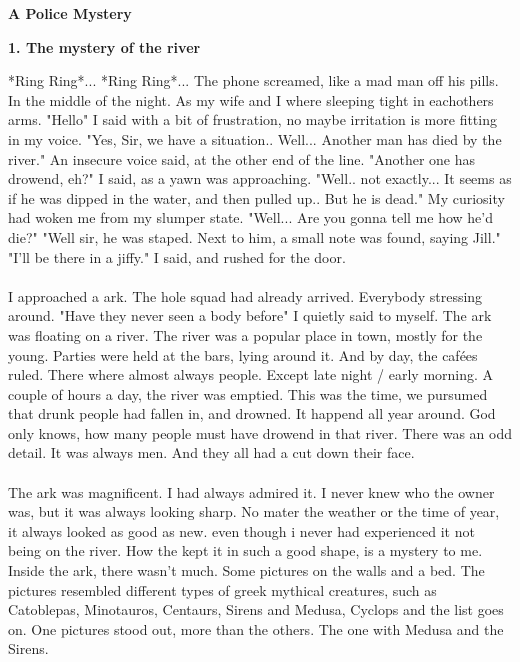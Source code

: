 \documentclass[]{article}
\begin{document}
\newpage

\begin{center}
	\Large\textbf{A Police Mystery}
\end{center}

\begin{center}
	\large\textbf{1. The mystery of the river}
\end{center}

*Ring Ring*... *Ring Ring*... The phone screamed, like a mad man off his pills. In the middle of the night. As my wife and I where sleeping tight in eachothers arms. "Hello" I said with a bit of frustration, no maybe irritation is more fitting in my voice. "Yes, Sir, we have a situation.. Well... Another man has died by the river." An insecure voice said, at the other end of the line. "Another one has drowend, eh?" I said, as a yawn was approaching. "Well.. not exactly... It seems as if he was dipped in the water, and then pulled up.. But he is dead." My curiosity had woken me from my slumper state. "Well... Are you gonna tell me how he'd die?" "Well sir, he was staped. Next to him, a small note was found, saying Jill." "I'll be there in a jiffy." I said, and rushed for the door.
\\ \\
I approached a ark. The hole squad had already arrived. Everybody stressing around. "Have they never seen a body before" I quietly said to myself. The ark was floating on a river. The river was a popular place in town, mostly for the young. Parties were held at the bars, lying around it. And by day, the cafées ruled. There where almost always people. Except late night / early morning. A couple of hours a day, the river was emptied. This was the time, we pursumed that drunk people had fallen in, and drowned. It happend all year around. God only knows, how many people must have drowend in that river. There was an odd detail. It was always men. And they all had a cut down their face.
\\ \\
The ark was magnificent. I had always admired it. I never knew who the owner was, but it was always looking sharp. No mater the weather or the time of year, it always looked as good as new. even though i never had experienced it not being on the river. How the kept it in such a good shape, is a mystery to me. Inside the ark, there wasn't much. Some pictures on the walls and a bed. The pictures resembled different types of greek mythical  creatures, such as Catoblepas, Minotauros, Centaurs, Sirens and Medusa, Cyclops and the list goes on. One pictures stood out, more than the others. The one with Medusa and the Sirens.
\end{document}
